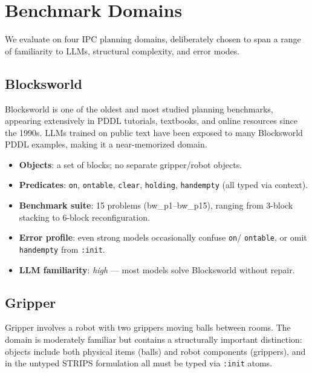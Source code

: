\documentclass{article}
\begin{document}
\section{Benchmark Domains}
\label{sec:domains}

We evaluate on four IPC planning domains, deliberately chosen to span a range of
familiarity to LLMs, structural complexity, and error modes.

\subsection{Blocksworld}
\label{sec:bw}

Blocksworld is one of the oldest and most studied planning benchmarks, appearing
extensively in PDDL tutorials, textbooks, and online resources since the 1990s.
LLMs trained on public text have been exposed to many Blocksworld PDDL examples,
making it a near-memorized domain.

\begin{itemize}[leftmargin=1.5em]
  \item \textbf{Objects}: a set of blocks; no separate gripper/robot objects.
  \item \textbf{Predicates}: \texttt{on}, \texttt{ontable}, \texttt{clear},
        \texttt{holding}, \texttt{handempty} (all typed via context).
  \item \textbf{Benchmark suite}: 15 problems (bw\_p1--bw\_p15), ranging from
        3-block stacking to 6-block reconfiguration.
  \item \textbf{Error profile}: even strong models occasionally confuse \texttt{on}/
        \texttt{ontable}, or omit \texttt{handempty} from \texttt{:init}.
  \item \textbf{LLM familiarity}: \emph{high} --- most models solve Blocksworld
        without repair.
\end{itemize}

\subsection{Gripper}
\label{sec:gripper}

Gripper involves a robot with two grippers moving balls between rooms.  The domain
is moderately familiar but contains a structurally important distinction: objects
include both physical items (balls) and robot components (grippers), and in the
untyped STRIPS formulation all must be typed via \texttt{:init} atoms.
\end{document}
